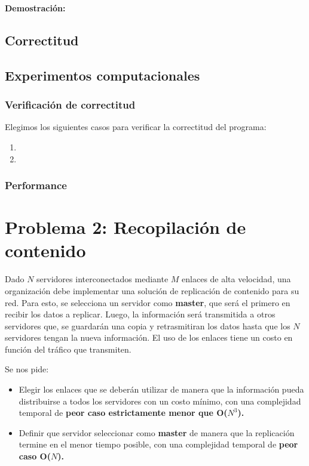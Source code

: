 \documentclass[a4paper, 10pt, twoside]{article}
\begin{document}
\textbf{Demostración: }

\subsection{Correctitud}

\subsection{Experimentos computacionales}
\subsubsection{Verificación de correctitud}

Elegimos los siguientes casos para verificar la correctitud del programa:

\begin{enumerate}
\item{}
\item{}
\end{enumerate}
\subsubsection{Performance}





\newpage

\section{Problema 2: Recopilación de contenido}

Dado $N$ servidores interconectados mediante $M$ enlaces de alta velocidad, una organización debe implementar una solución de replicación de contenido para su red. Para esto, se selecciona un servidor como \textbf{master}, que será el primero en recibir los datos a replicar. Luego, la información será transmitida a otros servidores que, se guardarán una copia y retrasmitiran los datos hasta que los $N$ servidores tengan la nueva información. El uso de los enlaces tiene un costo en función del tráfico que transmiten.

Se nos pide:
\begin{itemize}
    \item{Elegir los enlaces que se deberán utilizar de manera que la información pueda distribuirse a todos los servidores con un costo mínimo, con una complejidad temporal de \textbf{peor caso estrictamente menor que O($N^3$).}}
    \item{Definir que servidor seleccionar como \textbf{master} de manera que la replicación termine en el menor tiempo posible, con una complejidad temporal de \textbf{peor caso O($N$).}}
\end{itemize}
\end{document}

